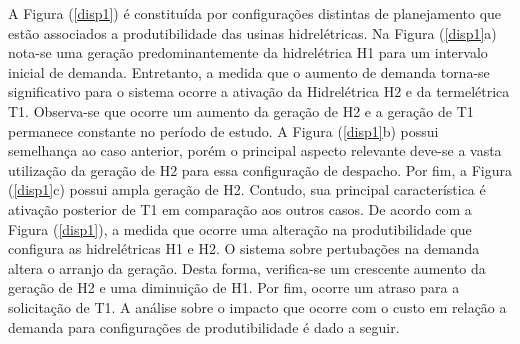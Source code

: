 \documentclass[12pt,fleqn]{article}
\begin{document}
A Figura (\ref{disp1}) \'e constitu\'ida por configura\c c\~oes distintas de planejamento que est\~ao associados a produtibilidade das usinas hidrel\'etricas. Na Figura (\ref{disp1}a) nota-se uma gera\c c\~ao predominantemente da hidrel\'etrica H1 para um intervalo inicial de demanda. Entretanto, a medida que o aumento de demanda torna-se significativo para o sistema ocorre a ativa\c c\~ao da Hidrel\'etrica H2 e da termel\'etrica T1. Observa-se que ocorre um aumento da gera\c c\~ao de H2 e a gera\c c\~ao de T1 permanece constante no per\'iodo de estudo. A Figura (\ref {disp1}b) possui semelhan\c ca ao caso anterior, por\'em  o principal aspecto relevante deve-se a vasta utiliza\c c\~ao da gera\c c\~ao de H2 para essa configura\c c\~ao de despacho. Por fim, a Figura (\ref{disp1}c) possui ampla gera\c c\~ao de H2. Contudo, sua principal caracter\'istica \'e ativa\c c\~ao posterior de T1 em compara\c c\~ao aos outros casos. De acordo com a Figura (\ref{disp1}), a medida que ocorre uma altera\c c\~ao na produtibilidade  que configura as hidrel\'etricas H1 e H2. O sistema sobre pertuba\c c\~oes na demanda altera o arranjo da gera\c c\~ao. Desta forma, verifica-se um crescente aumento da gera\c c\~ao de H2 e uma diminui\c c\~ao de H1. Por fim, ocorre  um atraso para a solicita\c c\~ao de T1. A an\'alise sobre o impacto que ocorre com o custo em rela\c c\~ao a demanda para configura\c c\~oes de produtibilidade \'e dado a seguir. 
\end{document}
